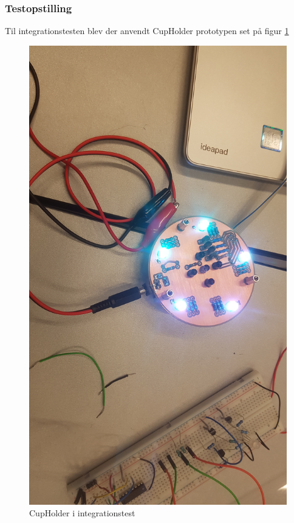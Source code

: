 \documentclass[Integrationstest/Integrationstest_main.tex]{subfiles}
\begin{document}
\subsubsection{Testopstilling}
Til integrationstesten blev der anvendt CupHolder prototypen set på figur \ref{fig:Cupholder_integration}
\begin{figure}[H]
    \centering
    \includegraphics[width=\textwidth]{Integrationstest/Integrationstest_PlayerSide/graphics/CupHolder.jpg}
    \caption{CupHolder i integrationstest}
    \label{fig:Cupholder_integration}
\end{figure}
\end{document}
